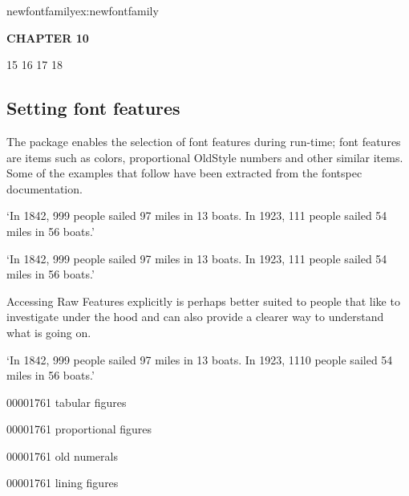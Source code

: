 \begin{texexample}{newfontfamily}{ex:newfontfamily}
 
\newfontfamily{}
\def\setchapterfont{%
   \calibri\huge\bfseries}

\bgroup
\setchapterfont CHAPTER 10
\egroup
\end{texexample}

\begin{teX}
15 \DeclareTextFontCommand{\textrm}{\rmfamily}
16 \DeclareTextFontCommand{\textsf}{\sffamily}
17 \DeclareTextFontCommand{\texttt}{\ttfamily}
18 \DeclareTextFontCommand{\textnormal}{\normalfont}
\end{teX}

\subsection{Setting font features}

The  package enables the selection of font features during run-time; font features are items such as colors, proportional OldStyle numbers and other similar items. Some of the examples that follow have been extracted from the fontspec documentation.

\ifxetex\else\if\luatex
\begin{texexample}{}{}
`In 1842, 999 people sailed 97 miles in
13 boats. In 1923, 111 people sailed 54
miles in 56 boats.' \bigskip

`In 1842, 999 people sailed 97 miles in
13 boats. In 1923, 111 people sailed 54
miles in 56 boats.' \bigskip
\end{texexample}

Accessing Raw Features explicitly is perhaps better suited to people that like to investigate under the hood and can also provide a clearer way to understand what is going on.
 
\begin{texexample}{}{}
`In 1842, 999 people sailed 97 miles in
13 boats. In 1923, 1110 people sailed 54
miles in 56 boats.' \bigskip

00001761 tabular figures \fox \bigskip

00001761 proportional figures \bigskip

00001761 old numerals\bigskip

00001761 lining figures\bigskip
\end{texexample}

